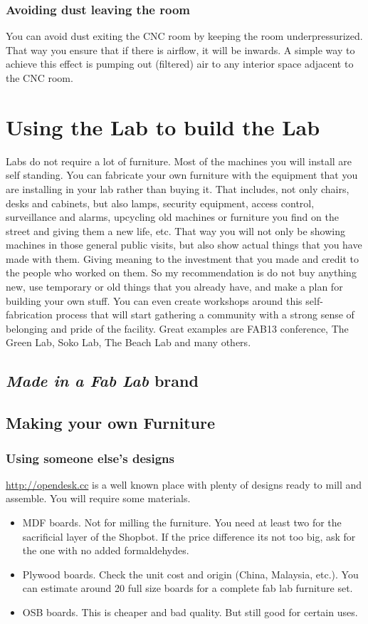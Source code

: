 \documentclass[a4paper,12pt,titlepage]{article}
\begin{document}
\subsubsection*{Avoiding dust leaving the room}
You can avoid dust exiting the CNC room by keeping the room underpressurized. That way you ensure that if there is airflow, it will be inwards. A simple way to achieve this effect is pumping out (filtered) air to any interior space adjacent to the CNC room.

\section{Using the Lab to build the Lab}
Labs do not require a lot of furniture. Most of the machines you will install are self standing. You can fabricate your own furniture with the equipment that you are installing in your lab rather than buying it. That includes, not only chairs, desks and cabinets, but also lamps, security equipment, access control, surveillance and alarms, upcycling old machines or furniture you find on the street and giving them a new life, etc. That way you will not only be showing machines in those general public visits, but also show actual things that you have made with them. Giving meaning to the investment that you made and credit to the people who worked on them. So my recommendation is do not buy anything new, use temporary or old things that you already have, and make a plan for building your own stuff. You can even create workshops around this self-fabrication process that will start gathering a community with a strong sense of belonging and pride of the facility. Great examples are FAB13 conference, The Green Lab, Soko Lab, The Beach Lab and many others.

\subsection{\textit{Made in a Fab Lab} brand}

\subsection{Making your own Furniture}

\subsubsection{Using someone else's designs}

\url{http://opendesk.cc} is a well known place with plenty of designs ready to mill and assemble. You will require some materials.
\begin{itemize}
\item MDF boards. Not for milling the furniture. You need at least two for the sacrificial layer of the Shopbot. If the price difference its not too big, ask for the one with no added formaldehydes.
\item Plywood boards. Check the unit cost and origin (China, Malaysia, etc.). You can estimate around 20 full size boards for a complete fab lab furniture set.
\item OSB boards. This is cheaper and bad quality. But still good for certain uses.
\end{itemize}
\end{document}
